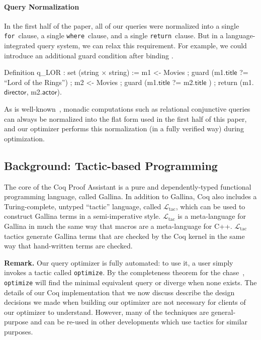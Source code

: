 \documentclass{sigplanconf}
\newcommand{\FOR}{{\tt for}\relax\ifmmode\ \else\xspace\fi}
\newcommand{\WHERE}{{\tt where}\relax\ifmmode\ \else\xspace\fi}
\newcommand{\RETURN}{{\tt return}\relax\ifmmode\ \else\xspace\fi}
\newcommand{\greg}[1]{\textcolor{blue}{GREG: #1}}
\newcommand{\ltac}[0]{\ensuremath{\mathcal{L}_{\mathrm{tac}}}}
\begin{document}




\paragraph{Query Normalization}
In the first half of the paper, all of our queries were normalized into a single \FOR clause, a single \WHERE clause, and a single \RETURN clause.  But in a language-integrated query system, we can relax this requirement.  For example, we could introduce an additional guard condition after binding .
\begin{coq}
Definition q_LOR : set (string $\times$ string) :=
  m1 <- Movies ;
  guard (m1.$\textsf{title}$ ?= ``Lord of the Rings'') ;
  m2 <- Movies ;
  guard (m1.$\textsf{title}$ ?= m2.$\textsf{title}$ ) ;
  return (m1.$\textsf{director}$, m2.$\textsf{actor}$).
\end{coq}
As is well-known~\cite{monad}, monadic computations such as relational conjunctive queries can always be normalized into the flat form used in the first half of this paper, and our optimizer performs this normalization (in a fully verified way) during optimization.


\subsection{Background: Tactic-based Programming}
\label{sec:tactic-based}

The core of the Coq Proof Assistant is a pure and dependently-typed functional programming language, called Gallina.  In addition to Gallina, Coq also includes a Turing-complete, untyped ``tactic'' language, called \ltac{}, which can be used to construct Gallina terms in a semi-imperative style. 
\ltac{} is a meta-language for Gallina in much the same way that macros are a meta-language for C++.
\ltac{} tactics generate Gallina terms that are checked by the Coq kernel in the same way that hand-written terms are checked.

{\bf Remark.}
Our query optimizer is fully automated: to use it, a user simply invokes a tactic called {\tt optimize}.
By the completeness theorem for the chase~\cite{Popa99anequational}, {\tt optimize} will find the minimal equivalent query or diverge when none exists.  The details of our Coq implementation that we now discuss describe the design decisions we made when building our optimizer are not necessary for clients of our optimizer to understand.
However, many of the techniques are general-purpose and can be re-used in other developments which use tactics for similar purposes.
\end{document}
